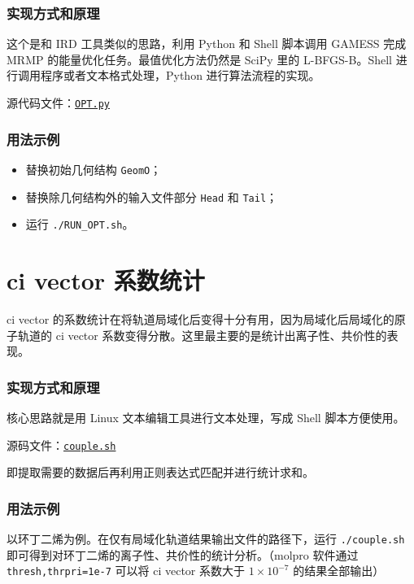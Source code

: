\documentclass[a4paper,openany]{book}
\begin{document}
\subsubsection{实现方式和原理}

这个是和 IRD 工具类似的思路，利用 Python 和 Shell 脚本调用 GAMESS 完成 MRMP 的能量优化任务。最值优化方法仍然是 SciPy 里的 L-BFGS-B。Shell 进行调用程序或者文本格式处理，Python 进行算法流程的实现。

源代码文件：\href{https://github.com/GFrankenstein/UM/blob/master/pdf/src/E\_OPT/OPT.py}{\texttt{OPT.py}}

\subsubsection{用法示例}

\begin{itemize}
\item
  替换初始几何结构 \texttt{GeomO}；
\item
  替换除几何结构外的输入文件部分 \texttt{Head} 和 \texttt{Tail}；
\item
  运行 \texttt{./RUN\_OPT.sh}。
\end{itemize}

\section{ci vector 系数统计}

ci vector 的系数统计在将轨道局域化后变得十分有用，因为局域化后局域化的原子轨道的 ci vector 系数变得分散。这里最主要的是统计出离子性、共价性的表现。

\subsubsection{实现方式和原理}

核心思路就是用 Linux 文本编辑工具进行文本处理，写成 Shell 脚本方便使用。

源码文件：\href{https://github.com/GFrankenstein/UM/blob/master/pdf/src/ci\_stat/couple.sh}{\texttt{couple.sh}}

即提取需要的数据后再利用正则表达式匹配并进行统计求和。

\subsubsection{用法示例}

以环丁二烯为例。在仅有局域化轨道结果输出文件的路径下，运行 \texttt{./couple.sh} 即可得到对环丁二烯的离子性、共价性的统计分析。（molpro 软件通过 \texttt{thresh,thrpri=1e-7} 可以将 ci vector 系数大于 $1\times 10^{-7}$ 的结果全部输出）
\end{document}
